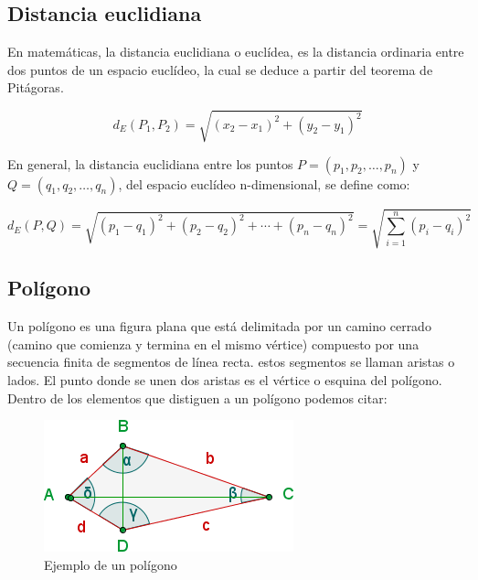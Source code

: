 \subsection{Distancia euclidiana}
En matemáticas, la distancia euclidiana o euclídea, es la distancia ordinaria entre dos puntos de un espacio euclídeo, la cual se deduce a partir del teorema de Pitágoras. 

$$ d_{E}(P_{1},P_{2})={\sqrt {(x_{2}-x_{1})^{2}+(y_{2}-y_{1})^{2}}} $$

En general, la distancia euclidiana entre los puntos $P=(p_{1},p_{2},\dots ,p_{n})$ y $Q=(q_{1},q_{2},\dots ,q_{n})$, del espacio euclídeo n-dimensional, se define como: 

$$ d_{E}(P,Q)={\sqrt {(p_{1}-q_{1})^{2}+(p_{2}-q_{2})^{2}+\cdots +(p_{n}-q_{n})^{2}}}={\sqrt {\sum _{i=1}^{n}(p_{i}-q_{i})^{2}}} $$

\subsection{Polígono}

Un polígono es una figura plana que está delimitada por un camino cerrado (camino que comienza y termina en el mismo vértice) compuesto por una secuencia finita de segmentos de línea recta. estos segmentos se llaman aristas o lados. El punto donde se unen dos aristas es el vértice o esquina del polígono. Dentro de los elementos que distiguen a un polígono podemos citar:

\begin{figure}[h!]
	\centering
	\includegraphics[width=0.35\linewidth]{img/elementos-de-un-poligono}
	\caption{Ejemplo de un polígono}
	\label{fig:elementos-de-un-poligono}
\end{figure}


